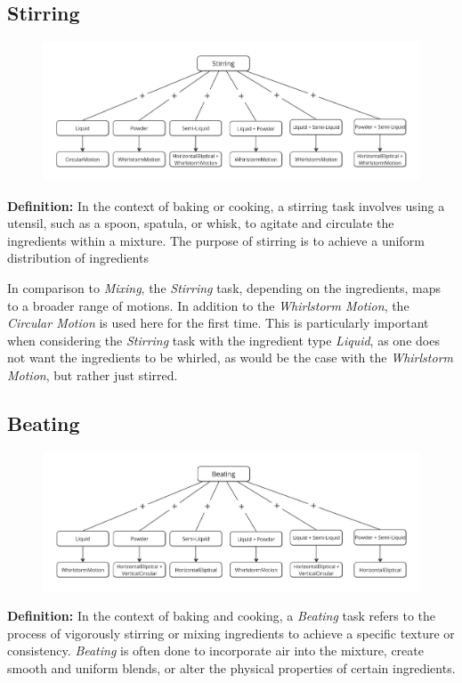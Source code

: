 \subsection{Stirring}
\begin{figure}[H]
    \includegraphics[scale=0.25]{Graphics/StirringDecisionTree.jpg}
    \end{figure}
\textbf{Definition:}
In the context of baking or cooking, a stirring task involves using a utensil, such as a spoon, spatula, or whisk, to agitate and circulate the ingredients within a mixture. The purpose of stirring is to achieve a uniform distribution of ingredients

In comparison to \textit{Mixing}, the \textit{Stirring} task, depending on the ingredients, maps to a broader range of motions. In addition to the \textit{Whirlstorm Motion}, the \textit{Circular Motion} is used here for the first time. This is particularly important when considering the \textit{Stirring} task with the ingredient type \textit{Liquid}, as one does not want the ingredients to be whirled, as would be the case with the \textit{Whirlstorm Motion}, but rather just stirred.
\subsection{Beating}
\begin{figure}[H]
    \includegraphics[scale=0.25]{Graphics/BeatingDecisionTree.jpg}
    \end{figure}
\textbf{Definition:}
In the context of baking and cooking, a \textit{Beating} task refers to the process of vigorously stirring or mixing ingredients to achieve a specific texture or consistency. \textit{Beating} is often done to incorporate air into the mixture, create smooth and uniform blends, or alter the physical properties of certain ingredients.

